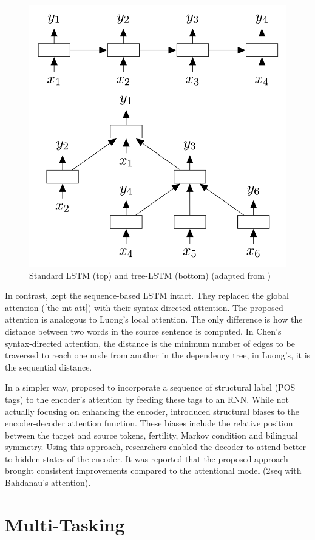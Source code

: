 \begin{figure}[t]
    \centering
    \includegraphics[width=0.7\linewidth]{img/tree-lstm.png}
    \caption{Standard LSTM (top) and tree-LSTM (bottom) (adapted from \cite{DBLP:conf/acl/TaiSM15})}
    \label{fig:tree-lstm}
\end{figure}

In contrast, \cite{DBLP:journals/corr/abs-1711-04231} kept the sequence-based LSTM intact.
They replaced the global attention (\cref{the-mt-att}) with their syntax-directed attention.
The proposed attention is analogous to Luong's local attention.
The only difference is how the distance between two words in the source sentence is computed.
In Chen's syntax-directed attention, the distance is the minimum number of edges to be traversed to reach one node from another in the dependency tree, in Luong's, it is the sequential distance.

In a simpler way, \cite{DBLP:conf/acl/LiXTZZZ17} proposed to incorporate a sequence of structural label (POS tags) to the encoder's attention by feeding these tags to an RNN.
While not actually focusing on enhancing the encoder, \cite{DBLP:conf/naacl/CohnHVYDH16} introduced structural biases to the encoder-decoder attention function.
These biases include the relative position between the target and source tokens, fertility, Markov condition and bilingual symmetry.
Using this approach, researchers enabled the decoder to attend better to hidden states of the encoder.
It was reported that the proposed approach brought consistent improvements compared to the attentional model (\seq2seq with Bahdanau's attention).

\section{Multi-Tasking}
\label{lit-mult}

